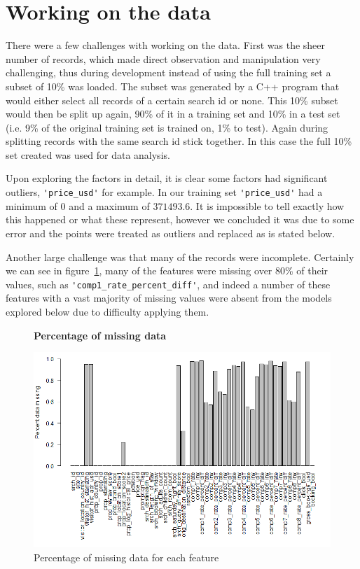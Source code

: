 \documentclass{llncs}
\begin{document}
\section{Working on the data}
\label{sec:working_on_data}

	There were a few challenges with working on the data. First was the sheer number of records, which made direct observation and manipulation very challenging, thus during development instead of using the full training set a subset of 10\% was loaded. The subset was generated by a C++ program that would either select all records of a certain search id or none. This 10\% subset would then be split up again, 90\% of it in a training set and 10\% in a test set (i.e. 9\% of the original training set is trained on, 1\% to test). Again during splitting records with the same search id stick together. In this case the full 10\% set created was used for data analysis.
	
	Upon exploring the factors in detail, it is clear some factors had significant outliers, \verb!'price_usd'! for example. In our training set \verb!'price_usd'! had a minimum of $0$ and a maximum of $371493.6$. It is impossible to tell exactly how this happened or what these represent, however we concluded it was due to some error and the points were treated as outliers and replaced as is stated below. 

	Another large challenge was that many of the records were incomplete. Certainly we can see in figure~\ref{fig:pctM}, many of the features were missing over 80\% of their values, such as \verb!'comp1_rate_percent_diff'!, and indeed a number of these features with a vast majority of missing values were absent from the models explored below due to difficulty applying them.
	
    \begin{figure}
	\centering
	\textbf{Percentage of missing data}\par\medskip
		\includegraphics[scale=0.4]{figures/pct_missing.png}
	\caption{Percentage of missing data for each feature}
	\label{fig:pctM}
	\end{figure}
\end{document}
